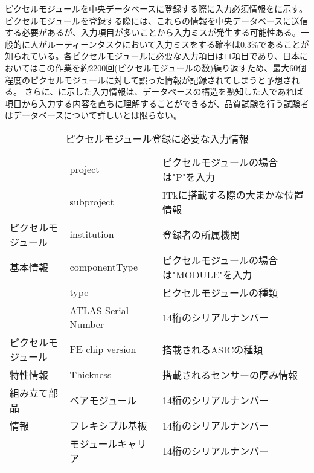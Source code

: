 ピクセルモジュールを中央データベースに登録する際に入力必須情報をに示す。
ピクセルモジュールを登録する際には、これらの情報を中央データベースに送信する必要があるが、入力項目が多いことから入力ミスが発生する可能性ある。一般的に人がルーティーンタスクにおいて入力ミスをする確率は$0.3\%$であることが知られている\cite{human}。各ピクセルモジュールに必要な入力項目は$11$項目であり、日本においてはこの作業を約$2200$回(ピクセルモジュールの数)繰り返すため、最大$60$個程度のピクセルモジュールに対して誤った情報が記録されてしまうと予想される。
さらに、に示した入力情報は、データベースの構造を熟知した人であれば項目から入力する内容を直ちに理解することができるが、品質試験を行う試験者はデータベースについて詳しいとは限らない。

\begin{table}[tbp]
  \begin{center}
    \caption[ピクセルモジュール登録に必要な入力情報]{ピクセルモジュール登録に必要な入力情報}
    \label{tab:nyuuryoku}
    \begin{tabular}{|l||l|l|}
    \hline
    & project &  ピクセルモジュールの場合は"P"を入力 \\
    \cline{2-3}
    & subproject & ITkに搭載する際の大まかな位置情報 \\
    \cline{2-3}
    ピクセルモジュール
    & institution & 登録者の所属機関 \\
    \cline{2-3}
    基本情報
    & componentType & ピクセルモジュールの場合は"MODULE"を入力 \\
    \cline{2-3}
    & type & ピクセルモジュールの種類 \\
    \cline{2-3}
    & ATLAS Serial Number & 14桁のシリアルナンバー \\
    \hline
    ピクセルモジュール
    & FE chip version & 搭載されるASICの種類 \\
    \cline{2-3}
    特性情報 & Thickness & 搭載されるセンサーの厚み情報 \\
    \hline
    組み立て部品 & ベアモジュール & 14桁のシリアルナンバー \\
    \cline{2-3}
    情報 & フレキシブル基板 & 14桁のシリアルナンバー \\
    \cline{2-3}
     & モジュールキャリア & 14桁のシリアルナンバー \\
    \hline
    \end{tabular}
  \end{center}
\end{table}


